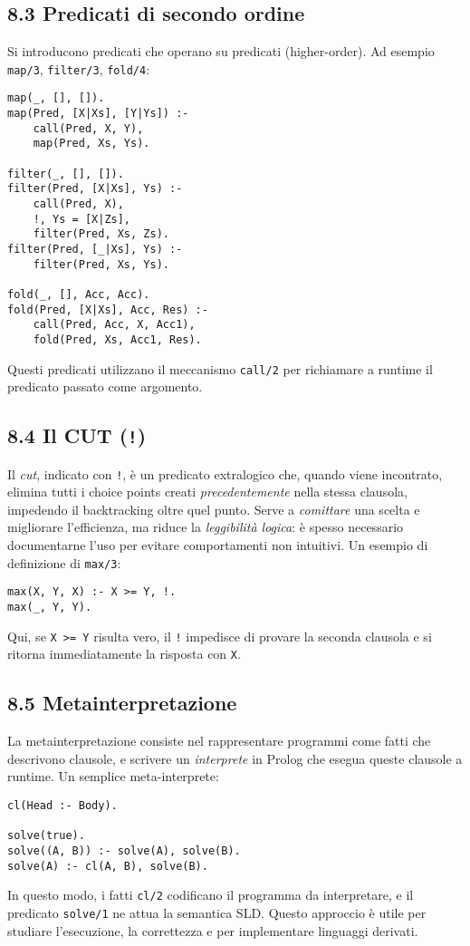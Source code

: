 \documentclass[12pt]{article}
\begin{document}
\subsection*{8.3 Predicati di secondo ordine}

Si introducono predicati che operano su predicati (higher-order). Ad esempio \texttt{map/3}, \texttt{filter/3}, \texttt{fold/4}:
\begin{verbatim}
map(_, [], []).
map(Pred, [X|Xs], [Y|Ys]) :-
    call(Pred, X, Y),
    map(Pred, Xs, Ys).

filter(_, [], []).
filter(Pred, [X|Xs], Ys) :-
    call(Pred, X),
    !, Ys = [X|Zs],
    filter(Pred, Xs, Zs).
filter(Pred, [_|Xs], Ys) :-
    filter(Pred, Xs, Ys).

fold(_, [], Acc, Acc).
fold(Pred, [X|Xs], Acc, Res) :-
    call(Pred, Acc, X, Acc1),
    fold(Pred, Xs, Acc1, Res).
\end{verbatim}
Questi predicati utilizzano il meccanismo \texttt{call/2} per richiamare a runtime il predicato passato come argomento.

\subsection*{8.4 Il CUT (\texttt{!})}

Il \emph{cut}, indicato con \texttt{!}, è un predicato extralogico che, quando viene incontrato, elimina tutti i choice points creati \emph{precedentemente} nella stessa clausola, impedendo il backtracking oltre quel punto. Serve a \emph{comittare} una scelta e migliorare l'efficienza, ma riduce la \emph{leggibilità logica}: è spesso necessario documentarne l'uso per evitare comportamenti non intuitivi. Un esempio di definizione di \texttt{max/3}:
\begin{verbatim}
max(X, Y, X) :- X >= Y, !.
max(_, Y, Y).
\end{verbatim}
Qui, se \texttt{X >= Y} risulta vero, il \texttt{!} impedisce di provare la seconda clausola e si ritorna immediatamente la risposta con \texttt{X}.

\subsection*{8.5 Metainterpretazione}

La metainterpretazione consiste nel rappresentare programmi come fatti che descrivono clausole, e scrivere un \emph{interprete} in Prolog che esegua queste clausole a runtime. Un semplice meta-interprete:
\begin{verbatim}
cl(Head :- Body).

solve(true).
solve((A, B)) :- solve(A), solve(B).
solve(A) :- cl(A, B), solve(B).
\end{verbatim}
In questo modo, i fatti \texttt{cl/2} codificano il programma da interpretare, e il predicato \texttt{solve/1} ne attua la semantica SLD. Questo approccio è utile per studiare l'esecuzione, la correttezza e per implementare linguaggi derivati.
\end{document}
